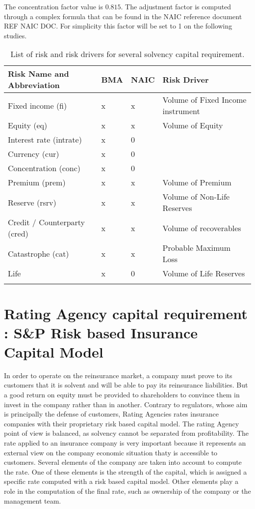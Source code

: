 The concentration factor value is $0.815$. The adjustment factor is computed through a complex formula that can be found in the NAIC reference document REF NAIC DOC. For simplicity this factor will be set to 1 on the following studies.



\begin{table}
\centering
\begin{tabular}{|l|l|l|l|}
\hline
   \textbf{Risk Name and Abbreviation} & \textbf{BMA} & \textbf{NAIC} & \textbf{Risk Driver} \\ \hline \hline
   Fixed income (fi) & x & x & Volume of Fixed Income instrument\\ \hline
   Equity (eq) & x & x & Volume of Equity \\ \hline
   Interest rate (intrate) & x & 0 & \\ \hline
   Currency (cur) & x & 0 & \\ \hline
   Concentration (conc) & x & 0 & \\ \hline
   Premium (prem) & x & x & Volume of Premium \\ \hline
   Reserve (rsrv) & x & x &  Volume of Non-Life Reserves \\ \hline
   Credit / Counterparty (cred) & x & x & Volume of recoverables\\ \hline
   Catastrophe (cat) & x & x & Probable Maximum Loss\\ \hline
   Life & x & 0 & Volume of Life Reserves\\ \hline
   \label{t:RISK_LIST}
\end{tabular}
   \caption{List of risk and risk drivers for several solvency capital requirement.}
\end{table}




\section{Rating Agency capital requirement : S\&P Risk based Insurance Capital Model}

In order to operate on the reinsurance market, a company must prove to its customers that it is solvent and will be able to pay its reinsurance liabilities. But a good return on equity must be provided to shareholders to convince them in invest in the company rather than in another. Contrary to regulators, whose aim is principally the defense of customers, Rating Agencies rates insurance companies with their proprietary risk based capital model. The rating Agency point of view is balanced, as solvency cannot be separated from profitability. 
The rate applied to an insurance company is very important because it represents an external view on the company economic situation thaty is accessible to customers.
Several elements of the company are taken into account to compute the rate. One of these elements is the strength of the capital, which is assigned a specific rate computed with a risk based capital model. Other elements play a role in the computation of the final rate, such as ownership of the company or the management team. 


